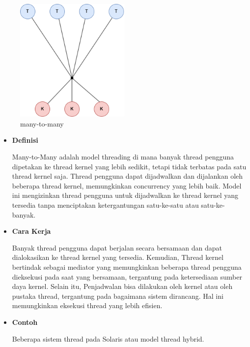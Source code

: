 \documentclass[12pt]{article}
\begin{document}
\begin{enumerate}
        \begin{figure}[h] 
            \centering 
            \includegraphics[width=0.5\textwidth]{asset/many to many.drawio.png} 
            \caption{many-to-many} 
            \label{fig:contoh} 
        \end{figure}
        \begin{itemize}
        \item\textbf{Definisi} 
        \par \hspace{2em} Many-to-Many adalah model threading di mana banyak thread pengguna dipetakan ke thread kernel yang lebih sedikit, tetapi tidak terbatas pada satu thread kernel saja. Thread pengguna dapat dijadwalkan dan dijalankan oleh beberapa thread kernel, memungkinkan concurrency yang lebih baik. Model ini mengizinkan thread pengguna untuk dijadwalkan ke thread kernel yang tersedia tanpa menciptakan ketergantungan satu-ke-satu atau satu-ke-banyak.
        \item\textbf{Cara Kerja}
        \par \hspace{2em} Banyak thread pengguna dapat berjalan secara bersamaan dan dapat dialokasikan ke thread kernel yang tersedia. Kemudian, Thread kernel bertindak sebagai mediator yang memungkinkan beberapa thread pengguna dieksekusi pada saat yang bersamaan, tergantung pada ketersediaan sumber daya kernel. Selain itu, Penjadwalan bisa dilakukan oleh kernel atau oleh pustaka thread, tergantung pada bagaimana sistem dirancang. Hal ini memungkinkan eksekusi thread yang lebih efisien.
        \item\textbf{Contoh}
        \par \hspace{2em} Beberapa sistem thread pada Solaris atau model thread hybrid.
    \end{itemize}
\end{enumerate}
\end{document}
